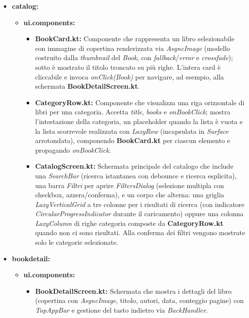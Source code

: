 \documentclass{article}
\begin{document}
\begin{itemize}
\begin{itemize}
  \end{itemize}
  \item \textbf{catalog:}
  \begin{itemize}
    \item \textbf{ui.components:}
    \begin{itemize}
      \item \textbf{BookCard.kt:} Componente che rappresenta un libro selezionabile con immagine di copertina renderizzata via \textit{AsyncImage}
       (modello costruito dalla \textit{thumbnail} del \textit{Book}, con \textit{fallback}/\textit{error} e \textit{crossfade}); sotto è mostrato il titolo troncato su più righe. 
       L’intera card è cliccabile e invoca \textit{onClick(Book)} per navigare, ad esempio, alla schermata \textbf{BookDetailScreen.kt}.
      \item \textbf{CategoryRow.kt:} Componente che visualizza una riga orizzontale di libri per una categoria. Accetta \textit{title}, \textit{books} e \textit{onBookClick}; mostra l’intestazione della categoria, un placeholder quando 
      la lista è vuota e la lista scorrevole realizzata con \textit{LazyRow} (incapsulata in \textit{Surface} arrotondata), componendo \textbf{BookCard.kt} per ciascun elemento e propagando \textit{onBookClick}.
      \item \textbf{CatalogScreen.kt:} Schermata principale del catalogo che include una \textit{SearchBar} (ricerca istantanea con debounce e ricerca esplicita), una barra \textit{Filtri} per aprire \textit{FiltersDialog} 
      (selezione multipla con checkbox, azzera/conferma), e un corpo che alterna: una griglia \textit{LazyVerticalGrid} a tre colonne per i risultati di ricerca (con indicatore \textit{CircularProgressIndicator} durante il caricamento) 
      oppure una colonna \textit{LazyColumn} di righe categoria composte da \textbf{CategoryRow.kt} quando non ci sono risultati. Alla conferma dei filtri vengono mostrate solo le categorie selezionate.
    \end{itemize}
  \end{itemize}
  \item \textbf{bookdetail:}
  \begin{itemize}
    \item \textbf{ui.components:}
    \begin{itemize}
      \item \textbf{BookDetailScreen.kt:} Schermata che mostra i dettagli del libro (copertina con \textit{AsyncImage}, titolo, autori, data, conteggio pagine) con \textit{TopAppBar} e gestione del tasto indietro via \textit{BackHandler}.

\end{itemize}
\end{itemize}
\end{itemize}
\end{document}
